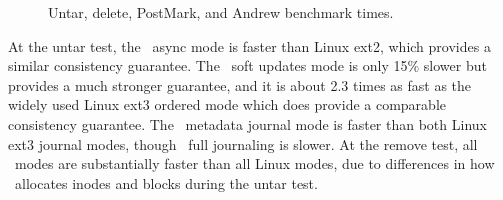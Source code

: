 \begin{figure*}[t]
\caption{\label{fig:bench_time} Untar, delete, PostMark, and Andrew
  benchmark times.}
\end{figure*}

At the untar test, the \Kudos\ async mode is faster than Linux ext2, which
provides a similar consistency guarantee. The \Kudos\ soft updates mode is
only 15\% slower but provides a much stronger guarantee, and it is about 2.3
times as fast as the widely used Linux ext3 ordered mode which does provide a
comparable consistency guarantee. The \Kudos\ metadata journal mode is faster
than both Linux ext3 journal modes, though \Kudos\ full journaling is slower.
At the remove test, all \Kudos\ modes are substantially faster than all Linux
modes, due to differences in how \Kudos\ allocates inodes and blocks during
the untar test.

